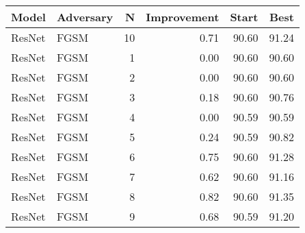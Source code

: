 \begin{tabular}{llrrrr}
\toprule
  Model & Adversary &   N &  Improvement &  Start &   Best \\
\midrule
 ResNet &      FGSM &  10 &         0.71 &  90.60 &  91.24 \\
 ResNet &      FGSM &   1 &         0.00 &  90.60 &  90.60 \\
 ResNet &      FGSM &   2 &         0.00 &  90.60 &  90.60 \\
 ResNet &      FGSM &   3 &         0.18 &  90.60 &  90.76 \\
 ResNet &      FGSM &   4 &         0.00 &  90.59 &  90.59 \\
 ResNet &      FGSM &   5 &         0.24 &  90.59 &  90.82 \\
 ResNet &      FGSM &   6 &         0.75 &  90.60 &  91.28 \\
 ResNet &      FGSM &   7 &         0.62 &  90.60 &  91.16 \\
 ResNet &      FGSM &   8 &         0.82 &  90.60 &  91.35 \\
 ResNet &      FGSM &   9 &         0.68 &  90.59 &  91.20 \\
\bottomrule
\end{tabular}

